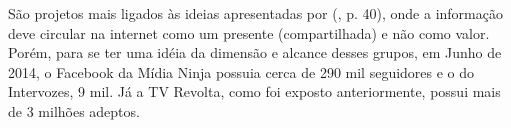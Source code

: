 \documentclass[
	article,			%
	12pt,				%
	oneside,			%
	a4paper,			%
	english,			%
	brazil,				%
	]{abntex2}
\begin{document}
São projetos mais ligados às ideias apresentadas por  (\citeyear{dantas2003}, p. 40), onde a informação deve circular na internet como um presente (compartilhada) e não como valor. Porém, para se ter uma idéia da dimensão e alcance desses grupos, em Junho de 2014, o Facebook da Mídia Ninja possuia cerca de 290 mil seguidores e o do Intervozes, 9 mil. Já a TV Revolta, como foi exposto anteriormente, possui mais de 3 milhões adeptos.


\end{document}
